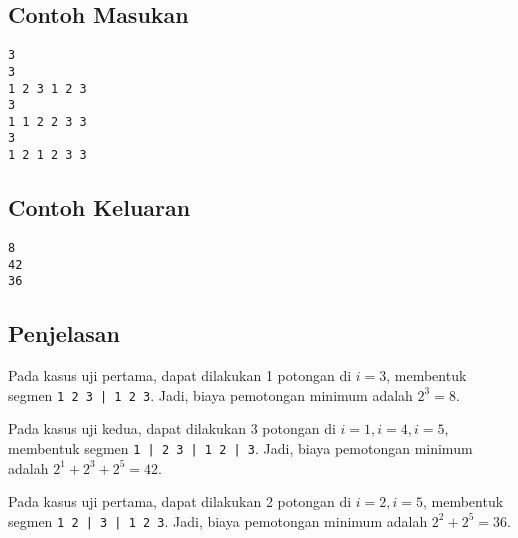 \documentclass{article}
\begin{document}
\begin{multicols}{2}
\subsection*{Contoh Masukan}
\begin{lstlisting}
3
3
1 2 3 1 2 3
3
1 1 2 2 3 3
3
1 2 1 2 3 3
\end{lstlisting}
\columnbreak
\subsection*{Contoh Keluaran}
\begin{lstlisting}
8
42
36
\end{lstlisting}
\vfill
\null
\end{multicols}

\subsection*{Penjelasan}
Pada kasus uji pertama, dapat dilakukan 1 potongan di $i=3$, membentuk segmen \lstinline{1 2 3 | 1 2 3}.
Jadi, biaya pemotongan minimum adalah $2^3 = 8$.

Pada kasus uji kedua, dapat dilakukan 3 potongan di $i=1, i=4, i=5$, membentuk segmen \lstinline{1 | 2 3 | 1 2 | 3}.
Jadi, biaya pemotongan minimum adalah $2^1 + 2^3 + 2^5 = 42$.

Pada kasus uji pertama, dapat dilakukan 2 potongan di $i=2, i=5$, membentuk segmen \lstinline{1 2 | 3 | 1 2 3}.
Jadi, biaya pemotongan minimum adalah $2^2 + 2^5 = 36$.

\pagebreak
\end{document}
